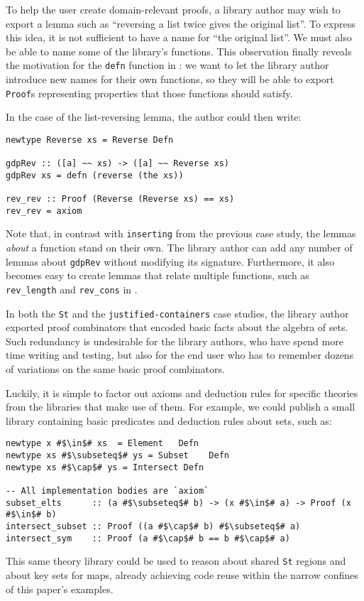 \documentclass[format=sigplan, review=false, screen=true]{acmart}
\makeatletter
\let\origsubsection\subsection
\renewcommand\subsection{\@ifstar{\starsubsection}{\nostarsubsection}}
\newcommand\nostarsubsection[1]
{\subsectionprelude\origsubsection{#1}\subsectionpostlude}
\newcommand\starsubsection[1]
{\subsectionprelude\origsubsection*{#1}\subsectionpostlude}
\newcommand\subsectionprelude{%
  \vspace{-0.25em}
}
\newcommand\subsectionpostlude{%
  \vspace{-0.05em}
}
\makeatother
\begin{document}
\subsection{Naming library functions}
To help the user create domain-relevant proofs, a library author may wish to export a lemma such
as ``reversing a list twice gives the original list''.
To express this idea, it is not sufficient to have a name for ``the original list''. We must also be able to
name some of the library's functions. This observation finally reveals the motivation for  the \texttt{defn}
function in : we want to let the library author introduce new names for their own functions,
so they will be able to export \texttt{Proof}s representing properties that those functions should satisfy.

In the case of the list-reversing lemma, the author could then write:
\begin{verbatim}
newtype Reverse xs = Reverse Defn

gdpRev :: ([a] ~~ xs) -> ([a] ~~ Reverse xs)
gdpRev xs = defn (reverse (the xs))

rev_rev :: Proof (Reverse (Reverse xs) == xs)
rev_rev = axiom
\end{verbatim}
Note that, in contrast with \texttt{inserting} from the previous case study,
the lemmas \emph{about} a function stand on their own.
The library author can add any number of lemmas about \texttt{gdpRev}
without modifying its signature. Furthermore, it also becomes easy to
create lemmas that relate multiple functions, such as \verb|rev_length|
and \verb|rev_cons| in .

\subsection{Building theory libraries}
In both the \texttt{St} and the \texttt{justified-containers} case studies,
the library author exported proof combinators that encoded basic facts about
the algebra of sets. Such redundancy is undesirable for the library authors,
who have spend more time writing and testing, but also for the end user who has to remember dozens of
variations on the same basic proof combinators.

Luckily, it is simple to factor out axioms and deduction rules for specific theories
from the libraries that make use of them. For example, we could publish a small
library containing basic predicates and deduction rules about sets, such as:
\begin{verbatim}
newtype x #$\in$# xs  = Element   Defn
newtype xs #$\subseteq$# ys = Subset    Defn
newtype xs #$\cap$# ys = Intersect Defn

-- All implementation bodies are `axiom`
subset_elts      :: (a #$\subseteq$# b) -> (x #$\in$# a) -> Proof (x #$\in$# b)
intersect_subset :: Proof ((a #$\cap$# b) #$\subseteq$# a)
intersect_sym    :: Proof (a #$\cap$# b == b #$\cap$# a)
\end{verbatim}
This same theory library could be used to reason about shared \texttt{St}
regions and about key sets for maps, already achieving code reuse within
the narrow confines of this paper's examples.
\end{document}

